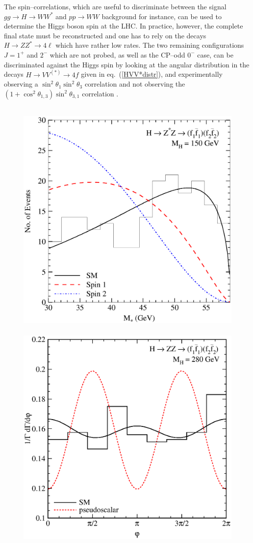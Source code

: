 The spin--correlations, which are useful to discriminate between the signal $gg
\to H \to WW^*$ and $pp \to WW$ background \cite{pp-HWW-lnln} for instance, can
be used to determine the Higgs boson spin at the LHC. In practice, however, the
complete final state
must be reconstructed and one has to rely on the decays $H\to ZZ^* \to 4\ell$
which have rather low rates. The two remaining configurations $J=1^+$ and $2^-$
which are not probed, as well as the CP--odd $0^-$ case, can be discriminated
against the Higgs spin by looking at the angular distribution in the decays $H
\to VV^{(*)} \to 4f$ given in eq.~(\ref{HVV*distr}), and experimentally
observing a $\sin^2 \theta_1 \sin^2 \theta_3$ correlation and not observing the
$(1+\cos^2\theta_{1,3}) \sin^2 \theta_{3,1}$ correlation 
\cite{Bargeretal,CPHVVchoi}.\s  

\begin{figure}[htb!]
\vspace*{-.5cm}
\begin{center}
\mbox{
\includegraphics[clip=true,trim=5 5 5 5,width=8.cm]{./sm3/hzz203.eps} \hspace*{-3mm}
\includegraphics[clip=true,trim=5 5 5 5,width=8.cm]{./sm3/angdistphi.eps} }

\end{center}
\end{figure}
